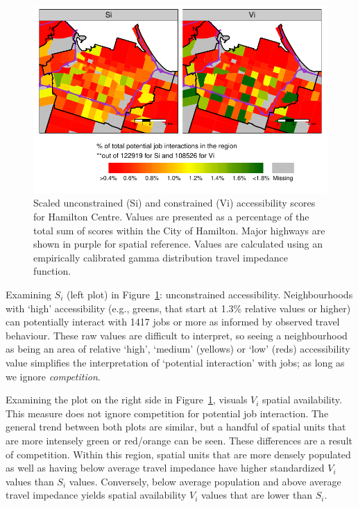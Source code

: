 \documentclass[12pt, oneside]{report}
\begin{document}
\begin{figure}

{\centering \includegraphics{tools-report_files/figure-pdf/fig-perc-con-and-unconstrained-access-1.pdf}

}

\caption{\label{fig-perc-con-and-unconstrained-access}Scaled
unconstrained (Si) and constrained (Vi) accessibility scores for
Hamilton Centre. Values are presented as a percentage of the total sum
of scores within the City of Hamilton. Major highways are shown in
purple for spatial reference. Values are calculated using an empirically
calibrated gamma distribution travel impedance function.}

\end{figure}

Examining \(S_i\) (left plot) in
Figure~\ref{fig-perc-con-and-unconstrained-access}: unconstrained
accessibility. Neighbourhoods with `high' accessibility (e.g., greens,
that start at 1.3\% relative values or higher) can potentially interact
with 1417 jobs or more as informed by observed travel behaviour. These
raw values are difficult to interpret, so seeing a neighbourhood as
being an area of relative `high', `medium' (yellows) or `low' (reds)
accessibility value simplifies the interpretation of `potential
interaction' with jobs; as long as we ignore \emph{competition}.

Examining the plot on the right side in
Figure~\ref{fig-perc-con-and-unconstrained-access}, visuals \(V_i\)
spatial availability. This measure does not ignore competition for
potential job interaction. The general trend between both plots are
similar, but a handful of spatial units that are more intensely green or
red/orange can be seen. These differences are a result of competition.
Within this region, spatial units that are more densely populated as
well as having below average travel impedance have higher standardized
\(V_i\) values than \(S_i\) values. Conversely, below average population
and above average travel impedance yields spatial availability \(V_i\)
values that are lower than \(S_i\).
\end{document}
